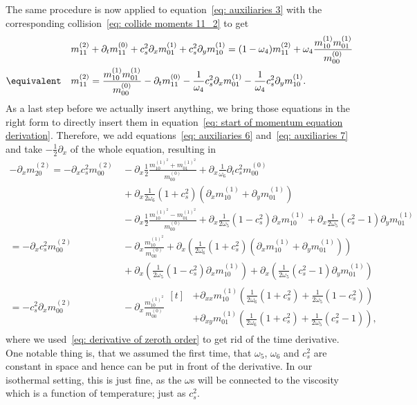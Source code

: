 The same procedure is now applied to equation~\eqref{eq: auxiliaries 3} with the corresponding collision~\eqref{eq: collide moments 11_2} to get
\begin{align}
  \label{eq: auxiliaries 8}
  &m_{11}^{(2)} + \partial_t m_{11}^{(0)} + c_s^2\partial_x m_{01}^{(1)} + c_s^2\partial_y m_{10}^{(1)} =  (1-\omega_4)m_{11}^{(2)} + \omega_4 \frac{ m_{10}^{(1)}m_{01}^{(1)}}{m_{00}^{(0)}}
  \\
  \equivalent\quad
  &m_{11}^{(2)}
  =
  \frac{ m_{10}^{(1)}m_{01}^{(1)}}{m_{00}^{(0)}}
  - \partial_t m_{11}^{(0)}
  - \frac{1}{\omega_4} c_s^2\partial_x m_{01}^{(1)}
  - \frac{1}{\omega_4} c_s^2\partial_y m_{10}^{(1)}
  .
\end{align}
As a last step before we actually insert anything, we bring those equations in the right form to directly insert them in equation~\eqref{eq: start of momentum equation derivation}.
Therefore, we add equations~\eqref{eq: auxiliaries 6} and~\eqref{eq: auxiliaries 7} and take $-\frac{1}{2}\partial_x$ of the whole equation, resulting in
\begin{align}
  -\partial_x m_{20}^{(2)}
  =
  - \partial_x c_s^2 m_{00}^{(2)}
  &\,
  - \partial_x\frac{1}{2}\frac{ m_{10}^{{(1)}^2} + m_{01}^{{(1)}^2}}{m_{00}^{(0)}}
  + \partial_x\frac{1}{\omega_6}\partial_t c_s^2 m_{00}^{(0)}
  \nonumber
  \\&\,
  + \partial_x\frac{1}{2\omega_6}(1+c_s^2)(\partial_x m_{10}^{(1)} + \partial_y m_{01}^{(1)})
  \nonumber
  \\&\,
  - \partial_x\frac{1}{2}\frac{ m_{10}^{{(1)}^2} - m_{01}^{{(1)}^2}}{m_{00}^{(0)}}
  + \partial_x\frac{1}{2\omega_5} (1 - c_s^2)\partial_x m_{10}^{(1)}
  + \partial_x\frac{1}{2\omega_5} (c_s^2 - 1)\partial_y m_{01}^{(1)}
  \nonumber
  \\
  =
  - \partial_x c_s^2 m_{00}^{(2)}
  &\,
  - \partial_x\frac{ m_{10}^{{(1)}^2} }{m_{00}^{(0)}}
  + \partial_x\left(\frac{1}{2\omega_6}(1+c_s^2)(\partial_x m_{10}^{(1)} + \partial_y m_{01}^{(1)})\right)
  \nonumber
  \\&\,
  + \partial_x\left(\frac{1}{2\omega_5} (1 - c_s^2)\partial_x m_{10}^{(1)}\right)
  + \partial_x\left(\frac{1}{2\omega_5} (c_s^2 - 1)\partial_y m_{01}^{(1)}\right)
  \nonumber
  \\
  \label{eq: auxiliaries 9}
  =
  - c_s^2 \partial_x  m_{00}^{(2)}
  &\,
  - \partial_x\frac{ m_{10}^{{(1)}^2} }{m_{00}^{(0)}}
  \begin{aligned}[t]
    &+ \partial_{xx} m_{10}^{(1)} \left(\frac{1}{2\omega_6}(1+c_s^2) + \frac{1}{2\omega_5} (1 - c_s^2)\right)
    \\&
    + \partial_{xy} m_{01}^{(1)} \left(\frac{1}{2\omega_6}(1+c_s^2) + \frac{1}{2\omega_5} (c_s^2 - 1)\right),
  \end{aligned}
\end{align}
where we used~\eqref{eq: derivative of zeroth order} to get rid of the time derivative.
One notable thing is, that we assumed the first time, that $\omega_5$, $\omega_6$ and $c_s^2$ are constant in space and hence can be put in front of the derivative.
In our isothermal setting, this is just fine, as the $\omega$s will be connected to the viscosity which is a function of temperature; just as $c_s^2$.

